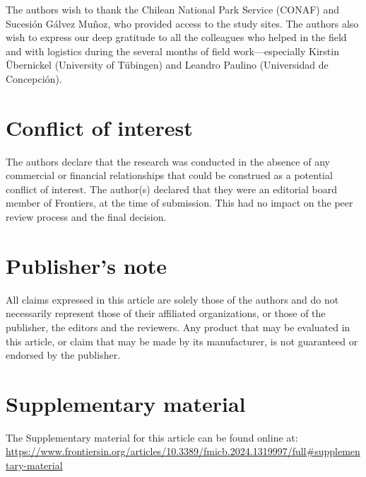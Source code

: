 The authors wish to thank the Chilean National Park Service (CONAF) and Sucesión Gálvez Muñoz, who provided access to the study sites. The authors also wish to express our deep gratitude to all the colleagues who helped in the field and with logistics during the several months of field work—especially Kirstin Übernickel (University of Tübingen) and Leandro Paulino (Universidad de Concepción).

\section*{Conflict of interest}

The authors declare that the research was conducted in the absence of any commercial or financial relationships that could be construed as a potential conflict of interest. The author(s) declared that they were an editorial board member of Frontiers, at the time of submission. This had no impact on the peer review process and the final decision.

\section*{Publisher's note}

All claims expressed in this article are solely those of the authors and do not necessarily represent those of their affiliated organizations, or those of the publisher, the editors and the reviewers. Any product that may be evaluated in this article, or claim that may be made by its manufacturer, is not guaranteed or endorsed by the publisher.

\section*{Supplementary material}

The Supplementary material for this article can be found online at: 
\url{https://www.frontiersin.org/articles/10.3389/fmicb.2024.1319997/full#supplementary-material}
